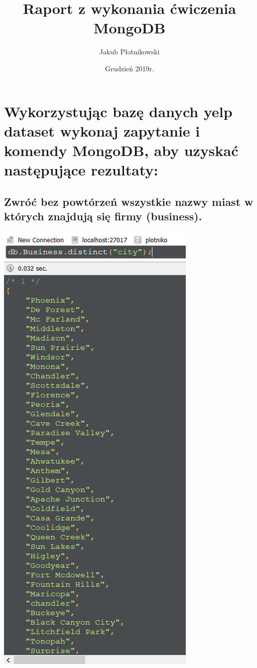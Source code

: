 \documentclass[a4paper, 11pt]{article}
\title{Raport z wykonania ćwiczenia MongoDB}
\author{Jakub Płotnikowski}
\date{Grudzień 2019r.}
\begin{document}
    \maketitle
    \tableofcontents

    \newpage

    \section{Wykorzystując bazę danych yelp dataset wykonaj zapytanie i komendy MongoDB,
    aby uzyskać następujące rezultaty:}


    \subsection{Zwróć bez powtórzeń wszystkie nazwy miast w których znajdują się firmy
    (business). }


    

    \begin{center}
        \includegraphics{images/task1/1a.png}
    \end{center}
\end{document}
